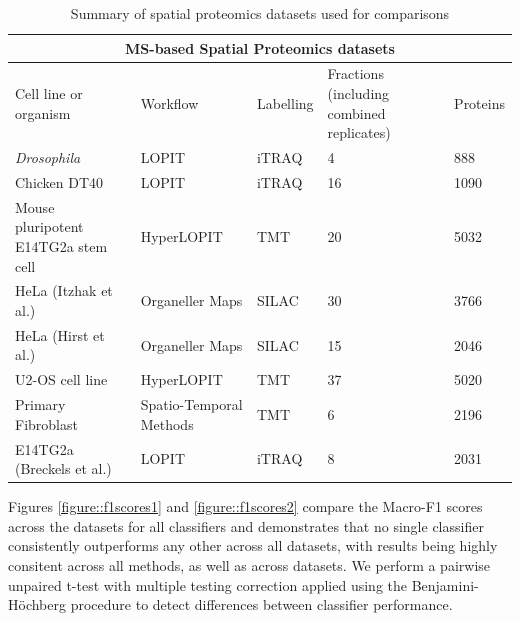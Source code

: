 \documentclass[12pt,english]{article}\usepackage[]{graphicx}\usepackage[]{color}
\begin{document}
\begin{table}[h]
\centering
\begin{tabular}{ |p{3cm}|p{3cm}|p{2cm}|p{2cm}|p{2cm}|  }
 \hline

 \multicolumn{5}{|c|}{MS-based Spatial Proteomics datasets} \\
 \hline
 Cell line or organism & Workflow & Labelling & Fractions (including combined replicates) & Proteins \\
 \hline
 \hline
 \textit{Drosophila}   &  LOPIT & iTRAQ & 4  & 888\\
 \hline
 Chicken DT40 & LOPIT  & iTRAQ & 16 & 1090 \\
 \hline
 Mouse pluripotent E14TG2a stem cell  &  HyperLOPIT & TMT & 20 & 5032\\
 \hline
 HeLa (Itzhak et al.) & Organeller Maps & SILAC & 30 & 3766\\
 \hline
 HeLa (Hirst et al.) & Organeller Maps  & SILAC & 15 & 2046\\
 \hline
 U2-OS cell line & HyperLOPIT  & TMT & 37 & 5020\\
 \hline
 Primary Fibroblast & Spatio-Temporal Methods & TMT & 6 & 2196 \\
 \hline
 E14TG2a (Breckels et al.)  &  LOPIT & iTRAQ & 8 & 2031\\
\hline
\end{tabular}
\caption{Summary of spatial proteomics datasets used for comparisons}
\label{table:data}
\end{table}

Figures \ref{figure::f1scores1} and \ref{figure::f1scores2} compare the Macro-F1 scores across the datasets for all classifiers
and demonstrates that no single classifier consistently outperforms any other across all datasets, with results being highly consitent across all methods, as well as across datasets. We perform a pairwise unpaired t-test with
multiple testing correction applied using the Benjamini-H\"ochberg procedure \citep{FDR:1995} to detect differences
between classifier performance.
\end{document}
